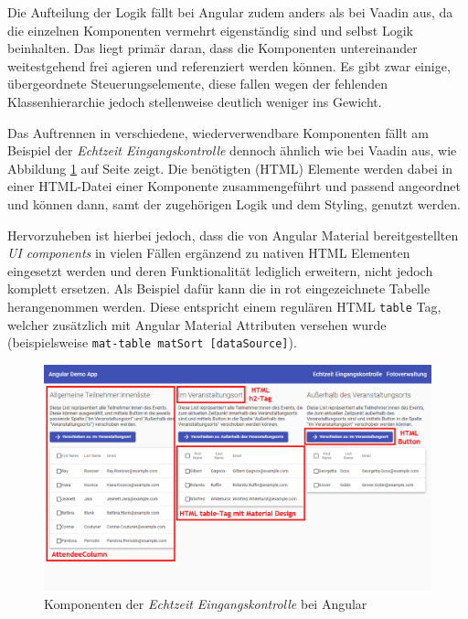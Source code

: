 \documentclass[a4paper,12pt,twoside]{scrreprt}
\begin{document}
\medskip

Die Aufteilung der Logik fällt bei Angular zudem anders als bei Vaadin aus, da die einzelnen Komponenten vermehrt eigenständig sind und selbst Logik beinhalten. Das liegt primär daran, dass die Komponenten untereinander weitestgehend frei agieren und referenziert werden können. Es gibt zwar einige, übergeordnete Steuerungselemente, diese fallen wegen der fehlenden Klassenhierarchie jedoch stellenweise deutlich weniger ins Gewicht.

\medskip

Das Auftrennen in verschiedene, wiederverwendbare Komponenten fällt am Beispiel der \textit{Echtzeit Eingangskontrolle} dennoch ähnlich wie bei Vaadin aus, wie Abbildung \ref{fig:results-angular-components} auf Seite \pageref{fig:results-angular-components} zeigt. Die benötigten (HTML) Elemente werden dabei in einer HTML-Datei einer Komponente zusammengeführt und passend angeordnet und können dann, samt der zugehörigen Logik und dem Styling, genutzt werden.

Hervorzuheben ist hierbei jedoch, dass die von Angular Material bereitgestellten \textit{UI components} in vielen Fällen ergänzend zu nativen HTML Elementen eingesetzt werden und deren Funktionalität lediglich erweitern, nicht jedoch komplett ersetzen. Als Beispiel dafür kann die in rot eingezeichnete Tabelle herangenommen werden. Diese entspricht einem regulären HTML \texttt{table} Tag, welcher zusätzlich mit Angular Material Attributen versehen wurde (beispielsweise \texttt{mat-table matSort [dataSource]}).

\begin{figure}[ht]
    \centering
    \includegraphics[scale=0.4]{images/Luidold_Results-Angular-Components.png}
    \caption[Komponenten der \textit{Echtzeit Eingangskontrolle} bei Angular]{Komponenten der \textit{Echtzeit Eingangskontrolle} bei Angular}
    \label{fig:results-angular-components}
\end{figure}
\end{document}
